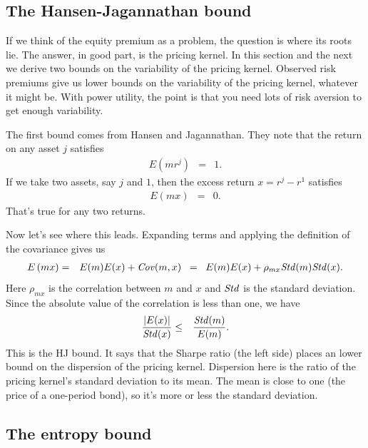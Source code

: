 \documentclass[11pt]{article}
\begin{document}
\subsection*{The Hansen-Jagannathan bound}

If we think of the equity premium as a problem, the question is where its roots lie.
The answer, in good part, is the pricing kernel.
In this section and the next we derive two bounds on the variability of the pricing kernel.
Observed risk premiums give us lower bounds on the variability of the pricing kernel,
whatever it might be.
With power utility, the point is that you need lots of risk aversion to get enough
variability.

The first bound comes from Hansen and Jagannathan.
They note that the return on any asset $j$ satisfies
\begin{eqnarray}
    E \left( m r^j \right) &=& 1 .
    \label{eq:foc}
\end{eqnarray}
If we take two assets, say $j$ and $1$,
then the excess return $x = r^j - r^1$ satisfies
\begin{eqnarray*}
    E \left( m x \right) &=& 0 .
\end{eqnarray*}
That's true for any two returns.

Now let's see where this leads.
Expanding terms and applying the definition of the covariance gives us
\begin{eqnarray*}
    E \left( m x \right) &=& E (m) E(x) + \mbox{\it Cov\/}(m,x)
            \;\;=\;\; E (m) E(x) + \rho_{mx} \mbox{\it Std\/}(m) \mbox{\it Std\/}(x) .
\end{eqnarray*}
Here $\rho_{mx}$ is the correlation between $m$ and $x$
and $\mbox{\it Std\/}$ is the standard deviation.
Since the absolute value of the correlation is less than one,
we have
\begin{eqnarray*}
  \frac{| E(x)|}{ \mbox{\it Std\/}(x)} &\leq& \frac{ \mbox{\it Std\/}(m)}{E(m)} .
\end{eqnarray*}
This is the HJ bound.
It says that the Sharpe ratio (the left side) places an lower bound
on the dispersion of the pricing kernel.
Dispersion here is the ratio of the pricing kernel's standard deviation to its mean.
The mean is close to one (the price of a one-period bond),
so it's more or less the standard deviation.


\subsection*{The entropy bound}
\end{document}
